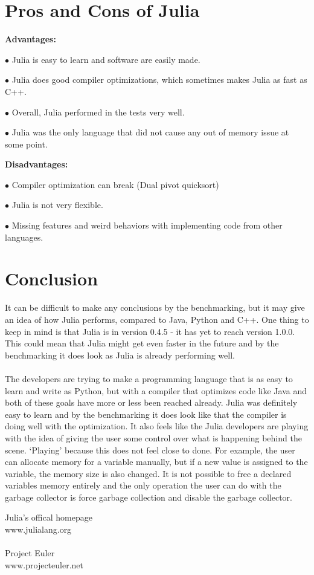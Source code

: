 \documentclass[landscape, a0]{sciposter}
\begin{document}
\begin{multicols}{3}
\section{Pros and Cons of Julia}
\textbf{Advantages:}
\begin{list}{}{}
	\item[$\bullet$] Julia is easy to learn and software are easily made.
	\item[$\bullet$] Julia does good compiler optimizations, which sometimes makes Julia as fast as C++.
	\item[$\bullet$] Overall, Julia performed in the tests very well.
	\item[$\bullet$] Julia was the only language that did not cause any out of memory issue at some point.
\end{list}
\textbf{Disadvantages:}
\begin{list}{}{}
	\item[$\bullet$] Compiler optimization can break (Dual pivot quicksort)
	\item[$\bullet$] Julia is not very flexible.
	\item[$\bullet$] Missing features and weird behaviors with implementing code from other languages.
\end{list}

\section{Conclusion}
It can be difficult to make any conclusions by the benchmarking, but it may give an idea of how Julia performs, compared to Java, Python and C++. One thing to keep in mind is that Julia is in version 0.4.5 - it has yet to reach version 1.0.0. This could mean that Julia might get even faster in the future and by the benchmarking it does look as Julia is already performing well. \\ \\ The developers are trying to make a programming language that is as easy to learn and write as Python, but with a compiler that optimizes code like Java and both of these goals have more or less been reached already. Julia was definitely easy to learn and by the benchmarking it does look like that the compiler is doing well with the optimization. It also feels like the Julia developers are playing with the idea of giving the user some control over what is happening behind the scene. ‘Playing’ because this does not feel close to done. For example, the user can allocate memory for a variable manually, but if a new value is assigned to the variable, the memory size is also changed. It is not possible to free a declared variables memory entirely and the only operation the user can do with the garbage collector is force garbage collection and disable the garbage collector. 

\begin{thebibliography}{m}

Julia's offical homepage\\
www.julialang.org\\
\\
Project Euler\\
www.projecteuler.net


\end{thebibliography}


\end{multicols}
\end{document}
